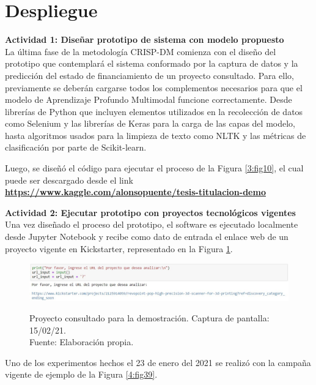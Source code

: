 \section{Despliegue}
\textbf{Actividad 1: Diseñar prototipo de sistema con modelo propuesto}
\\
La última fase de la metodología CRISP-DM comienza con el diseño del prototipo que contemplará el sistema conformado por la captura de datos y la predicción del estado de financiamiento de un proyecto consultado. Para ello, previamente se deberán cargarse todos los complementos necesarios para que el modelo de Aprendizaje Profundo Multimodal funcione correctamente. Desde librerías de Python que incluyen elementos utilizados en la recolección de datos como Selenium y las librerías de Keras para la carga de las capas del modelo, hasta algoritmos usados para la limpieza de texto como NLTK y las métricas de clasificación por parte de Scikit-learn.

Luego, se diseñó el código para ejecutar el proceso de la Figura \ref{3:fig10}, el cual puede ser descargado desde el link \textbf{\url{https://www.kaggle.com/alonsopuente/tesis-titulacion-demo}}

\textbf{Actividad 2: Ejecutar prototipo con proyectos tecnológicos vigentes}
\\
Una vez diseñado el proceso del prototipo, el software es ejecutado localmente desde Jupyter Notebook y recibe como dato de entrada el enlace web de un proyecto vigente en Kickstarter, representado en la Figura \ref{4:fig38}.

\begin{figure}[!ht]
	\begin{center}
		\includegraphics[width=1\textwidth]{4/figures/prototipo_input_project1.jpg}
		\caption[Proyecto consultado para la demostración. Captura de pantalla: 15/02/21]{Proyecto consultado para la demostración. Captura de pantalla: 15/02/21.\\
			Fuente: Elaboración propia.}
		\vspace{-0.5cm}
		\label{4:fig38}
	\end{center}
\end{figure}

Uno de los experimentos hechos el 23 de enero del 2021 se realizó con la campaña vigente de ejemplo de la Figura \ref{4:fig39}.

